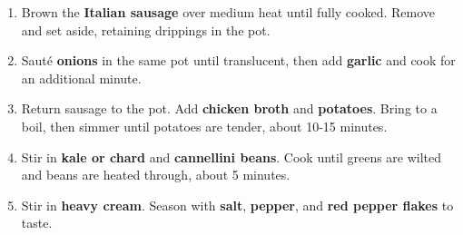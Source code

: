 \documentclass[11pt,letterpaper]{article}
\begin{document}
\begin{enumerate}
    \item Brown the \textbf{Italian sausage} over medium heat until fully cooked. Remove and set aside, retaining drippings in the pot.
    \item Sauté \textbf{onions} in the same pot until translucent, then add \textbf{garlic} and cook for an additional minute.
    \item Return sausage to the pot. Add \textbf{chicken broth} and \textbf{potatoes}. Bring to a boil, then simmer until potatoes are tender, about 10-15 minutes.
    \item Stir in \textbf{kale or chard} and \textbf{cannellini beans}. Cook until greens are wilted and beans are heated through, about 5 minutes.
    \item Stir in \textbf{heavy cream}. Season with \textbf{salt}, \textbf{pepper}, and \textbf{red pepper flakes} to taste.
\end{enumerate}
\end{document}
